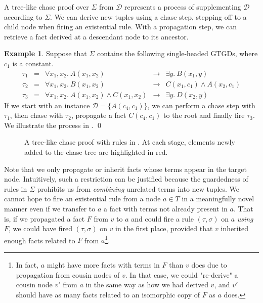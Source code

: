 \documentclass[12pt]{report}
\theoremstyle{plain}
\theoremstyle{definition}
\newtheorem{example}[theorem]{Example}
\begin{document}
A tree-like chase proof over $\Sigma$ from $\mathcal{D}$ represents a process of supplementing $\mathcal{D}$ according to $\Sigma$. We can derive new tuples using a chase step, stepping off to a child node when firing an existential rule. With a propagation step, we can retrieve a fact derived at a descendant node to its ancestor.

\begin{example}
\label{example:tree-like-chase-proof-example}
  Suppose that $\Sigma$ contains the following single-headed GTGDs, where $c_1$ is a constant.
  \[\begin{array}{rcrcl}
    \tau_1 &=& \forall x_1,x_2.\ A(x_1, x_2) &\rightarrow& \exists y.\ B(x_1, y) \\
    \tau_2 &=& \forall x_1,x_2.\ B(x_1, x_2) &\rightarrow& C(x_1, c_1) \wedge A(x_2, c_1) \\
    \tau_3 &=& \forall x_1,x_2.\ A(x_1, x_2) \wedge C(x_1, x_2) &\rightarrow& \exists y.\ D(x_2, y)
  \end{array}\]
  If we start with an instance $\mathcal{D} = \{A(c_4, c_1)\}$, we can perform a chase step with $\tau_1$, then chase with $\tau_2$, propagate a fact $C(c_4, c_1)$ to the root and finally fire $\tau_3$. We illustrate the process in .
  \qed
\end{example}

\begin{figure}[t]
  \centering
  
  \caption{A tree-like chase proof with rules in . At each stage, elements newly added to the chase tree are highlighted in red.}
  \label{figure:tree-like-chase-proof-example}
\end{figure}

Note that we only propagate or inherit facts whose terms appear in the target node. Intuitively, such a restriction can be justified because the guardedness of rules in $\Sigma$ prohibits us from \emph{combining} unrelated terms into new tuples. We cannot hope to fire an existential rule from a node $a \in T$ in a meaningfully novel manner even if we transfer to $a$ a fact with terms not already present in $a$. That is, if we propagated a fact $F$ from $v$ to $a$ and could fire a rule $(\tau, \sigma)$ on $a$ \emph{using} $F$, we could have fired $(\tau, \sigma)$ on $v$ in the first place, provided that $v$ inherited enough facts related to $F$ from $a$\footnote{In fact, $a$ might have more facts with terms in $F$ than $v$ does due to propagation from cousin nodes of $v$. In that case, we could "re-derive" a cousin node $v'$ from $a$ in the same way as how we had derived $v$, and $v'$ should have as many facts related to an isomorphic copy of $F$ as $a$ does.}.
\end{document}
